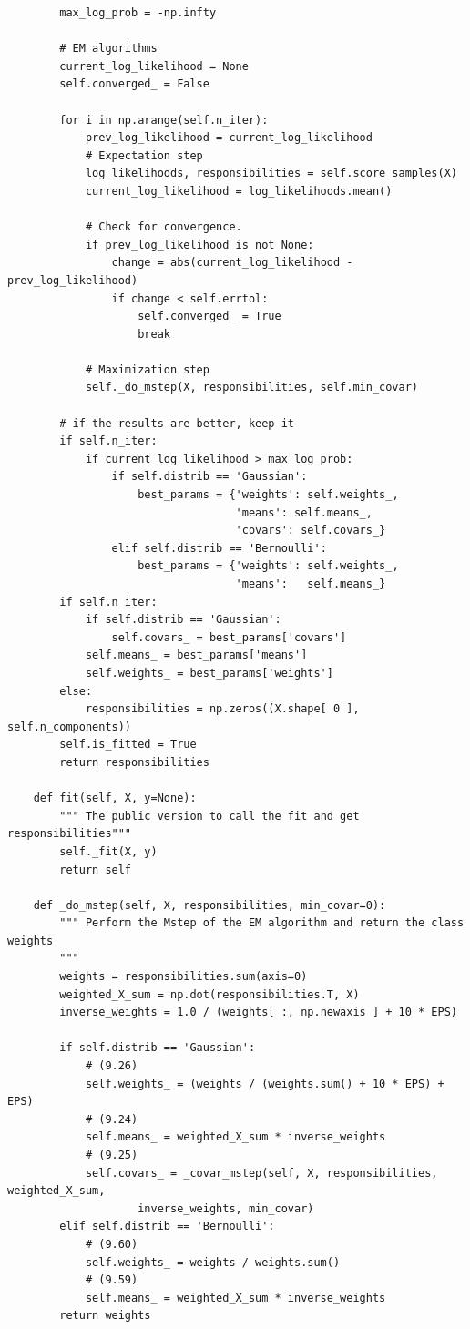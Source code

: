 \begin{verbatim}
        max_log_prob = -np.infty

        # EM algorithms
        current_log_likelihood = None
        self.converged_ = False

        for i in np.arange(self.n_iter):
            prev_log_likelihood = current_log_likelihood
            # Expectation step
            log_likelihoods, responsibilities = self.score_samples(X)
            current_log_likelihood = log_likelihoods.mean()

            # Check for convergence.
            if prev_log_likelihood is not None:
                change = abs(current_log_likelihood - prev_log_likelihood)
                if change < self.errtol:
                    self.converged_ = True
                    break

            # Maximization step
            self._do_mstep(X, responsibilities, self.min_covar)

        # if the results are better, keep it
        if self.n_iter:
            if current_log_likelihood > max_log_prob:
                if self.distrib == 'Gaussian':
                    best_params = {'weights': self.weights_,
                                   'means': self.means_,
                                   'covars': self.covars_}
                elif self.distrib == 'Bernoulli':
                    best_params = {'weights': self.weights_,
                                   'means':   self.means_}
        if self.n_iter:
            if self.distrib == 'Gaussian':
                self.covars_ = best_params['covars']
            self.means_ = best_params['means']
            self.weights_ = best_params['weights']
        else:
            responsibilities = np.zeros((X.shape[ 0 ], self.n_components))
        self.is_fitted = True
        return responsibilities

    def fit(self, X, y=None):
        """ The public version to call the fit and get responsibilities"""
        self._fit(X, y)
        return self

    def _do_mstep(self, X, responsibilities, min_covar=0):
        """ Perform the Mstep of the EM algorithm and return the class weights
        """
        weights = responsibilities.sum(axis=0)
        weighted_X_sum = np.dot(responsibilities.T, X)
        inverse_weights = 1.0 / (weights[ :, np.newaxis ] + 10 * EPS)

        if self.distrib == 'Gaussian':
            # (9.26)
            self.weights_ = (weights / (weights.sum() + 10 * EPS) + EPS)
            # (9.24)
            self.means_ = weighted_X_sum * inverse_weights
            # (9.25)
            self.covars_ = _covar_mstep(self, X, responsibilities, weighted_X_sum,
                    inverse_weights, min_covar)
        elif self.distrib == 'Bernoulli':
            # (9.60)
            self.weights_ = weights / weights.sum()
            # (9.59)
            self.means_ = weighted_X_sum * inverse_weights
        return weights


\end{verbatim}
